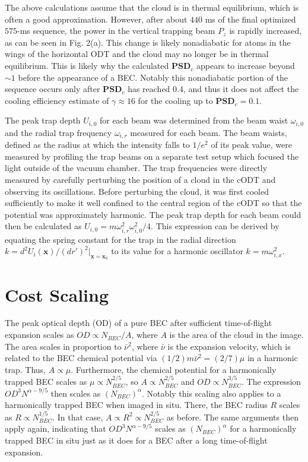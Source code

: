 \documentclass{article}
\begin{document}
The above calculations assume that the cloud is in thermal equilibrium, which is often a good approximation. However, after about $440$ ms of the final optimized $575$-ms sequence, the power in the vertical trapping beam $P_z$ is rapidly increased, as can be seen in Fig. 2(a). This change is likely nonadiabatic for atoms in the wings of the horizontal ODT and the cloud may no longer be in thermal equilibrium. This is likely why the calculated $\mathbf{PSD}_c$ appears to increase beyond $\sim 1$ before the appearance of a BEC. Notably this nonadiabatic portion of the sequence occurs only after $\mathbf{PSD}_c$ has reached 0.4, and thus it does not affect the cooling efficiency estimate of $\gamma \approx 16$ for the cooling up to $\mathbf{PSD}_c = 0.1$.

The peak trap depth $U_{i,0}$ for each beam was determined from the beam waist $\omega_{i,0}$ and the radial trap frequency $\omega_{i,r}$ measured for each beam. The beam waists, defined as the radius at which the intensity falls to $1/e^2$ of its peak value, were measured by profiling the trap beams on a separate test setup which focused the light outside of the vacuum chamber. The trap frequencies were directly measured by carefully perturbing the position of a cloud in the cODT and observing its oscillations. Before perturbing the cloud, it was first cooled sufficiently to make it well confined to the central region of the cODT so that the potential was approximately harmonic. The peak trap depth for each beam could then be calculated as $U_{i,0} = m \omega^2_{i,r} \omega^2_{i,0}/4$. This expression can be derived by equating the spring constant for the trap in the radial direction $k = d^2 U_i(\mathbf{x})/(dr')^2 \vert_{\mathbf{x}=\mathbf{x}_0}$ to its value for a harmonic oscillator $k = m \omega^2_{i,x}$.

\section{Cost Scaling}
\label{sec: cost scaling}

The peak optical depth (OD) of a pure BEC after sufficient time-of-flight expansion scales as $OD \propto N_{BEC}/A$, where $A$ is the area of the cloud in the image. The area scales in proportion to $\bar{\nu}^2$, where $\bar{\nu}$ is the expansion velocity, which is related to the BEC chemical potential via $(1/2)m\bar{\nu}^2 = (2/7)\mu$ in a harmonic trap. Thus, $A \propto \mu$. Furthermore, the chemical potential for a harmonically trapped BEC scales as $\mu \propto N^{2/5}_{BEC}$, so $A \propto N^{2/5}_{BEC}$ and $OD \propto N^{3/5}_{BEC}$. The expression $OD^3 N^{\alpha-9/5}$ then scales as $(N_{BEC})^\alpha$. Notably this scaling also applies to a harmonically trapped BEC when imaged in situ. There, the BEC radius $R$ scales as $R \propto N^{1/5}_{BEC}$. In that case, $A \propto R^2 \propto N^{2/5}_{BEC}$ as before. The same arguments then apply again, indicating that $OD^3 N^{\alpha-9/5}$ scales as $(N_{BEC})^\alpha$ for a harmonically trapped BEC in situ just as it does for a BEC after a long time-of-flight expansion.
\end{document}
